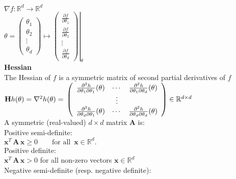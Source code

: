 $\nabla f:\mathbb {R}^ d \rightarrow \mathbb {R}^ d $\\
$\displaystyle \theta =\begin{pmatrix} \theta _1\\ \theta _2\\ \vdots \\ \theta _ d\end{pmatrix} \displaystyle \mapsto \displaystyle \left.\begin{pmatrix}  \frac{\partial f }{\partial \theta _1}\\ \frac{\partial f }{\partial \theta _2}\\ \vdots \\ \frac{\partial f }{\partial \theta _ d}\end{pmatrix}\right|_{\theta }$\\
\textbf{Hessian}\\

The Hessian of $f$ is a symmetric matrix of second partial derivatives of $f$\\

$\mathbf{H} h(\theta )= \nabla ^{2} h(\theta )= \\
\left(\begin{array}{ c c c }
\frac{\partial ^{2} h}{\partial \theta _{1} \partial \theta _{1}} (\theta ) & \cdots  & \frac{\partial ^{2} h}{\partial \theta _{1} \partial \theta _{d}} (\theta )\\
 & \vdots  & \\
\frac{\partial ^{2} h}{\partial \theta _{d} \partial \theta _{1}} (\theta ) & \cdots  & \frac{\partial ^{2} h}{\partial \theta _{d} \partial \theta _{d}} (\theta )
\end{array}\right) \in \mathbb{R}^{d\times d}$\\

A symmetric (real-valued) $d\times d$  matrix $\mathbf{A}$ is:\\

Positive semi-definite:\\
$\mathbf{x}^ T \, \mathbf{A}\, \mathbf{x} \geq 0\qquad \text {for all }\,  \mathbf{x}\in \mathbb {R}^ d.$\\

Positive definite:\\
$\mathbf{x}^ T \, \mathbf{A}\, \mathbf{x}> 0$ for all non-zero vectors $\mathbf{x}\in \mathbb {R}^ d$\\

Negative semi-definite (resp. negative definite):\\

